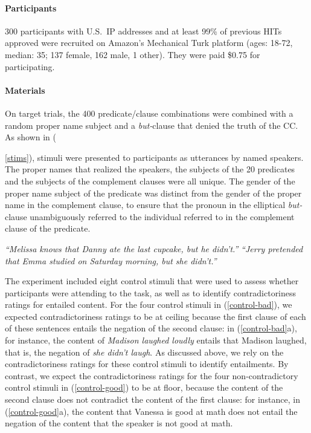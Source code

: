 \documentclass[11pt,fleqn]{article}
\newcommand{\6}{\mbox{$[\hspace*{-.6mm}[$}}
\newcommand{\9}{\mbox{$]\hspace*{-.6mm}]$}}
\begin{document}
\paragraph{Participants} 300 participants with U.S.\ IP addresses and at least 99\% of previous HITs approved were recruited on Amazon's Mechanical Turk platform (ages: 18-72, median: 35; 137 female, 162 male, 1 other). They were paid \$0.75 for participating.

\paragraph{Materials} On target trials, the 400 predicate/clause combinations were combined with a random proper name subject and a {\em but-}clause that denied the truth of the CC. As shown in ({\ref{stims}), stimuli were presented to participants as utterances by named speakers. The proper names that realized the speakers, the subjects of the 20 predicates and the subjects of the complement clauses were all unique. The gender of the proper name subject of the predicate was distinct from the gender of the proper name in the complement clause, to ensure that the pronoun in the elliptical {\em but-}clause unambiguously referred to the individual referred to in the complement clause of the predicate.

\begin{exe}
\ex\label{stims}
\begin{xlist}
 {\em ``Melissa knows that Danny ate the last cupcake, but he didn't.''}
 {\em ``Jerry pretended that Emma studied on Saturday morning, but she didn't.''}
\end{xlist}
\end{exe}

The experiment  included eight control stimuli that were used to assess whether participants were attending to the task, as well as to identify contradictoriness ratings for entailed content. For the four control stimuli in (\ref{control-bad}), we expected contradictoriness ratings to be at ceiling because the first clause of each of these sentences entails the negation of the second clause: in (\ref{control-bad}a), for instance, the content of {\em Madison laughed loudly} entails that Madison laughed, that is, the negation of {\em she didn't laugh}. As discussed above, we rely on the contradictoriness ratings for these control stimuli to identify entailments. By contrast, we expect the contradictoriness ratings for the four non-contradictory control stimuli in (\ref{control-good}) to be at floor, because the content of the second clause does not contradict the content of the first clause: for instance, in (\ref{control-good}a), the content that Vanessa is good at math does not entail the negation of the content that the speaker is not good at math. 

}
\end{document}
